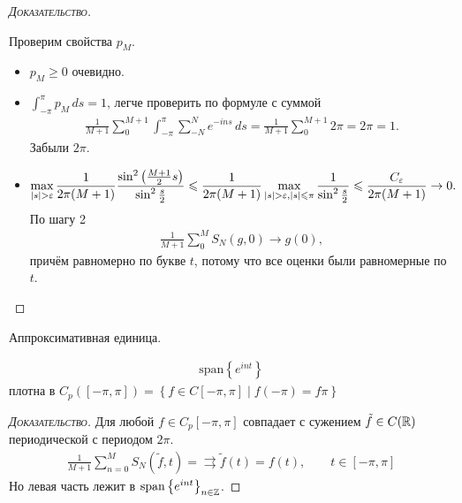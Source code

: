 \documentclass[../complex-analysis.tex]{subfiles}
\begin{document}
\begin{proof}[\normalfont\textsc{Доказательство}]
\begin{enumerate}
 Проверим свойства $ p_M $.
   \begin{itemize}
  \item $ p_M \geqslant 0 $   очевидно.
  \item $ \int_{-\pi}^{\pi} p_M\,ds = 1 $, легче проверить по формуле с суммой
   \begin{align*}
    \frac{1}{M+1} \sum_{0}^{M+1} \int_{-\pi}^{\pi} \sum_{-N}^{N} e^{-ins}\,ds = \frac{1}{M+1} \sum_{0}^{M+1} 2\pi = 2\pi = 1.
   \end{align*} Забыли $ 2\pi $.
  \item
   \begin{align*}
    \max_{\left| s \right| > \varepsilon} \frac{1}{2\pi(M+1)} \frac{\sin^{2} \left( \frac{M+1}{2} s \right)}{\sin^{2} \frac{s}{2}} \leqslant \frac{1}{2\pi(M+1)} \max_{\left| s \right|  > \varepsilon, \left| s \right| \leqslant \pi} \frac{1}{\sin^{2} \frac{s}{2}} \leqslant \frac{C_\varepsilon}{2\pi (M+1)} \to 0.
   \end{align*} По шагу 2 
   \begin{align*}
    \frac{1}{M+1} \sum_{0}^{M} S_N(g,0) \to g(0),
   \end{align*} причём равномерно по букве $ t $, потому что все оценки были равномерные по $ t $.
 \end{itemize}
 \end{enumerate}
\end{proof}

Аппроксимативная единица.

\begin{crly}
 \begin{align*}
  \mathrm{span} \left\{ e^{int} \right\}
 \end{align*} плотна в $ C_p([-\pi,\pi]) = \left\{ f \in C[-\pi,\pi] \mid f(-\pi) = f\pi \right\} $
\end{crly}
\begin{proof}[\normalfont\textsc{Доказательство}]
 Для любой $ f \in C_p [-\pi,\pi] $ совпадает с сужением $ \tilde f \in C(\mathbb{R}) $ периодической с периодом $ 2\pi $.
 \begin{align*}
  \frac{1}{M+1} \sum_{n=0}^{M} S_N(\tilde f, t) = \rightrightarrows \tilde f(t) = f(t), \qquad t \in [-\pi,\pi]
 \end{align*} Но левая часть лежит в $ \mathrm{span} \left\{ e^{int} \right\}_{n \in \mathbb{Z}} $.
\end{proof}
\end{document}
